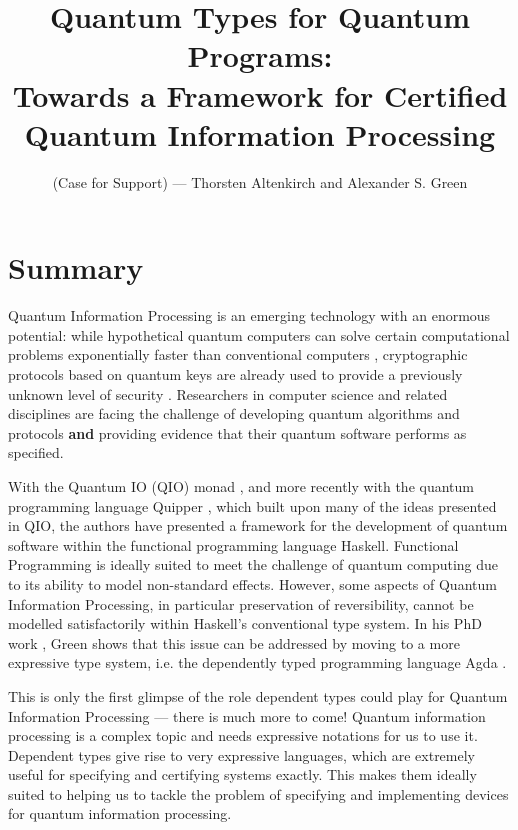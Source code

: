 \documentclass[a4paper]{article}
\title{Quantum Types for Quantum Programs:\\
 \Large Towards a Framework for Certified Quantum Information Processing
}
\author{(Case for Support) --- Thorsten Altenkirch and Alexander S. Green}
\date{}
\newcommand{\txa}[1]{\marginpar{txa:#1}}
\begin{document}
\maketitle
\section*{Summary}
Quantum Information Processing is an emerging technology with an enormous
potential: while hypothetical quantum computers can solve certain
computational problems exponentially faster than conventional
computers ,
cryptographic protocols based on quantum keys  are
already used to provide a previously unknown level of security
. Researchers in
computer science and related disciplines are facing the challenge of
developing quantum algorithms  and protocols \textbf{and}
providing evidence that their quantum software performs as
specified. 

With the Quantum IO (QIO) monad
, and more recently with the quantum
programming language Quipper ,
which built upon many of the ideas presented in QIO, the authors have
presented a framework for the development of quantum software within
the functional programming language Haskell.
\txa{Talk about Quipper}
 Functional
Programming is ideally suited to meet the challenge of quantum
computing due to its ability to model
non-standard effects. However, some aspects of Quantum Information Processing,
in particular preservation of reversibility, cannot be modelled satisfactorily
within Haskell's conventional type system. In his PhD work
, Green shows that this issue can be addressed
by moving to a more expressive type system, i.e. the dependently typed
programming language Agda . 

This is only the first glimpse of the role dependent types could play
for Quantum Information Processing --- there is much more to come!
Quantum information processing is a complex topic and needs expressive
notations for us to use it. Dependent types give rise to very expressive
languages, which are extremely useful for specifying and certifying systems exactly.
This makes them ideally suited to helping us to tackle the
problem of specifying and implementing devices for quantum information
processing. 

\end{document}
